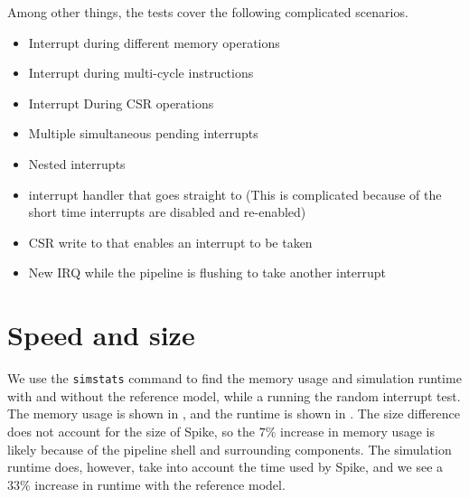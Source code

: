Among other things, the tests cover the following complicated scenarios. 
\begin{itemize}
    \item Interrupt during different memory operations
    \item Interrupt during multi-cycle instructions
    \item Interrupt During CSR operations
    \item Multiple simultaneous pending interrupts 
    \item Nested interrupts
    \item interrupt handler that goes straight to  (This is complicated because of the short time interrupts are disabled and re-enabled)
    \item CSR write to  that enables an interrupt to be taken
    \item New IRQ while the pipeline is flushing to take another interrupt
\end{itemize}






\section{Speed and size}
\label{sec:res_sizespeed}

We use the \lstinline{simstats} command to find the memory usage and simulation runtime with and without the reference model, while a running the random interrupt test. The memory usage is shown in , and the runtime is shown in . The size difference does not account for the size of Spike, so the $7\%$ increase in memory usage is likely because of the pipeline shell and surrounding components. The simulation runtime does, however, take into account the time used by Spike, and we see a $33\%$ increase in runtime with the reference model.



